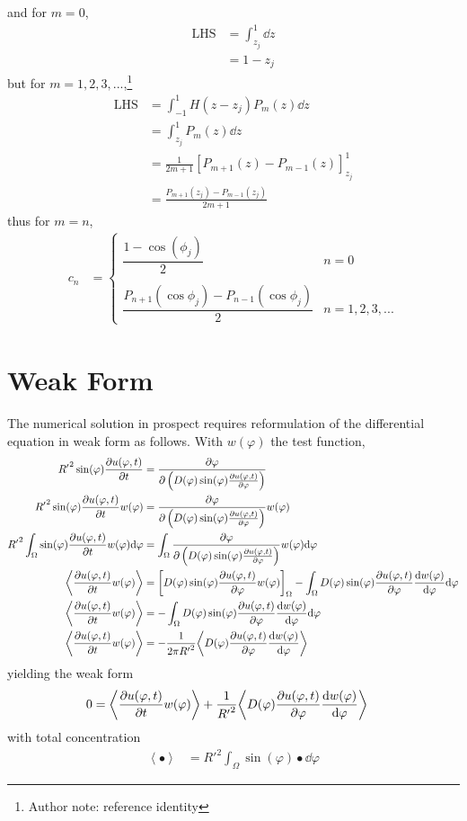 \documentclass{report}
\newcommand\Par[1]{{ \left({#1}\right) }}
\newcommand\Brack[1]{{ \left[{#1}\right] }}
\newcommand\Angle[1]{{ \left\langle{#1}\right\rangle }}
\newcommand\R{{ R' }}
\begin{document}
and for $m = 0$,
\begin{align*}
	\text{LHS} &= \int_{z_j}^1 \dd{z} \\
	&= 1 - z_j
\end{align*}
but for $m = 1, 2, 3, ...$,\footnote{Author note: reference identity}
\begin{align*}
	\text{LHS} &= \int_{-1}^1 H(z - z_j) P_m(z) \dd{z} \\
	&= \int_{z_j}^1 P_m(z) \dd{z} \\
	&= \frac{1}{2m + 1} \Brack{P_{m+1}(z) - P_{m-1}(z)}_{z_j}^1 \\
	&= \frac{P_{m+1}(z_j) - P_{m-1}(z_j)}{2m + 1}
\end{align*}
thus for $m = n$,
\begin{align*}
	c_n &= \begin{cases}
		\dfrac{1 - \cos(\phi_j)}{2} & n = 0 \\ \\
		\dfrac{P_{n+1}\Par{\cos\phi_j} - P_{n-1}\Par{\cos\phi_j}}{2} & n = 1, 2, 3, ...
	\end{cases}
\end{align*}

\section{Weak Form}
The numerical solution in prospect requires reformulation of the differential equation in weak form as follows. With $w(\varphi)$ the test function,
\begin{align*}
	\R^2 \sin(\varphi) \pdv{u(\varphi, t)}{t} &= \pdv\varphi\Par{D(\varphi) \sin(\varphi) \pdv{u(\varphi, t)}{\varphi}} \\
	\R^2 \sin(\varphi) \pdv{u(\varphi, t)}{t} w(\varphi) &= \pdv\varphi\Par{D(\varphi) \sin(\varphi) \pdv{u(\varphi, t)}{\varphi}} w(\varphi) \\
	\R^2 \int_\Omega \sin(\varphi) \pdv{u(\varphi, t)}{t} w(\varphi) \dd\varphi &= \int_\Omega \pdv\varphi\Par{D(\varphi) \sin(\varphi) \pdv{u(\varphi, t)}{\varphi}} w(\varphi) \dd\varphi \\
	\Angle{\pdv{u(\varphi, t)}{t} w(\varphi)} &= \Brack{D(\varphi) \sin(\varphi) \pdv{u(\varphi, t)}{\varphi} w(\varphi)}_\Omega
	- \int_\Omega D(\varphi) \sin(\varphi) \pdv{u(\varphi, t)}{\varphi} \dv{w(\varphi)}{\varphi} \dd\varphi \\
	\Angle{\pdv{u(\varphi, t)}{t} w(\varphi)} &= -\int_\Omega D(\varphi) \sin(\varphi) \pdv{u(\varphi, t)}{\varphi} \dv{w(\varphi)}{\varphi} \dd\varphi \\
	\Angle{\pdv{u(\varphi, t)}{t} w(\varphi)} &= - \frac{1}{2\pi \R^2} \Angle{D(\varphi) \pdv{u(\varphi, t)}{\varphi} \dv{w(\varphi)}{\varphi}}
\end{align*}
yielding the weak form
\begin{align*}
	0 &= \Angle{\pdv{u(\varphi, t)}{t} w(\varphi)} + \frac{1}{\R^2} \Angle{D(\varphi) \pdv{u(\varphi, t)}{\varphi} \dv{w(\varphi)}{\varphi}}
\end{align*}
with total concentration
\begin{align*}
	\Angle{\bullet} &= \R^2 \int_\Omega \sin(\varphi) \bullet \dd\varphi
\end{align*}
\end{document}
